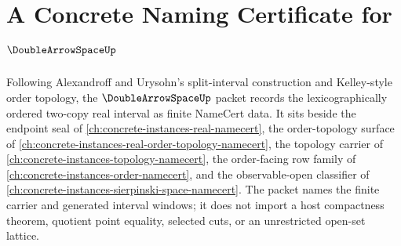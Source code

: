 \chapter{A Concrete Naming Certificate for $\DoubleArrowSpaceUp$}
\label{ch:concrete-instances-double-arrow-space-namecert}

Following Alexandroff and Urysohn's split-interval construction and Kelley-style order topology, the $\DoubleArrowSpaceUp$ packet records the lexicographically ordered two-copy real interval as finite NameCert data. It sits beside the endpoint seal of \autoref{ch:concrete-instances-real-namecert}, the order-topology surface of \autoref{ch:concrete-instances-real-order-topology-namecert}, the topology carrier of \autoref{ch:concrete-instances-topology-namecert}, the order-facing row family of \autoref{ch:concrete-instances-order-namecert}, and the observable-open classifier of \autoref{ch:concrete-instances-sierpinski-space-namecert}. The packet names the finite carrier and generated interval windows; it does not import a host compactness theorem, quotient point equality, selected cuts, or an unrestricted open-set lattice.

